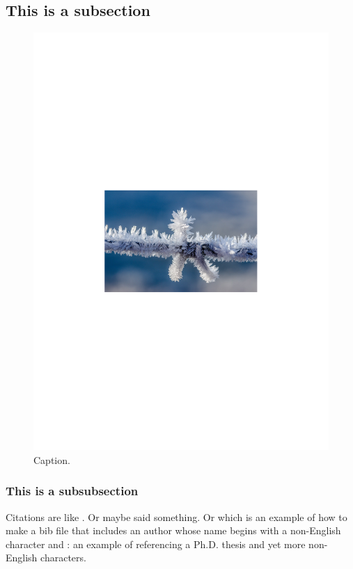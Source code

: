 \subsection{This is a subsection}
\begin{figure}[t]
	\centering
	\includegraphics[width=.6\linewidth]{Chapter_1/Figs/Fig1.pdf}
	\caption[TOC Figure Description]{Caption.}
	\label{fig:Fig1}
\end{figure}
\subsubsection{This is a subsubsection}
Citations are like \cite{goossens93,AbedonHymanThomas2003}.  Or maybe \cite{Abedon1994} said something.  Or \cite{Cerveny} which is an example of how to make a bib file that includes an author whose name begins with a non-English character and \cite{forgues96}: an example of referencing a Ph.D. thesis and yet more non-English characters.






